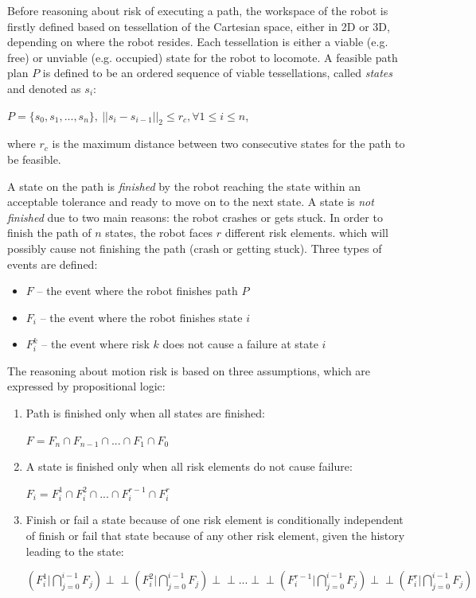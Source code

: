 \documentclass[letterpaper]{article} %
\begin{document}
Before reasoning about risk of executing a path, the workspace of the robot is firstly defined based on tessellation of the Cartesian space, either in 2D or 3D, depending on where the robot resides. Each tessellation is either a viable (e.g. free) or unviable (e.g. occupied) state for the robot to locomote. A feasible path plan $P$ is defined to be an ordered sequence of viable tessellations, called \emph{states} and denoted as $s_i$:

\begin{center}
$P = \{s_0, s_1, ..., s_n\},~|| s_i - s_{i-1}||_2 \leq r_c, \forall 1 \leq i \leq n$, 
\end{center}

where $r_c$ is the maximum distance between two consecutive states for the path to be feasible. 

A state on the path is \emph{finished} by the robot reaching the state within an acceptable tolerance and ready to move on to the next state. A state is \emph{not finished} due to two main reasons: the robot crashes or gets stuck. In order to finish the path of $n$ states, the robot faces $r$ different risk elements. which will possibly cause not finishing the path (crash or getting stuck). Three types of events are defined: 

\begin{itemize}
\item $F$ -- the event where the robot finishes path $P$
\item $F_i$ -- the event where the robot finishes state $i$
\item $F_i^k$ -- the event where risk $k$ does not cause a failure at state $i$
\end{itemize}

The reasoning about motion risk is based on three assumptions, which are expressed by propositional logic: 
\begin{enumerate}
	\item Path is finished only when all states are finished: 
	\begin{center}
	$F = F_n \cap F_{n-1} \cap ... \cap F_1 \cap F_0$
	\end{center}
	
	\item A state is finished only when all risk elements do not cause failure: 
	\begin{center}
	$F_i = F_i^1 \cap F_i^2 \cap ... \cap F_i^{r-1} \cap F_i^r$
	\end{center}
	
	\item Finish or fail a state because of one risk element is conditionally independent of finish or fail that state because of any other risk element, given the history leading to the state:  
	\begin{center}
	$(F_i^1 \vert \bigcap \limits_{j=0}^{i-1} F_j) \perp \!\!\! \perp (F_i^2 \vert \bigcap \limits_{j=0}^{i-1} F_j) \perp \!\!\! \perp ... \perp \!\!\! \perp (F_i^{r-1} \vert \bigcap \limits_{j=0}^{i-1} F_j) \perp \!\!\! \perp (F_i^r \vert \bigcap \limits_{j=0}^{i-1} F_j)$
	\end{center}
\end{enumerate}
\end{document}
